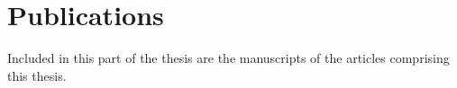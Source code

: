 \chapter*{Publications}
%
\label{chap:publications}

\noindent
Included in this part of the thesis are the manuscripts of the articles comprising this thesis.


